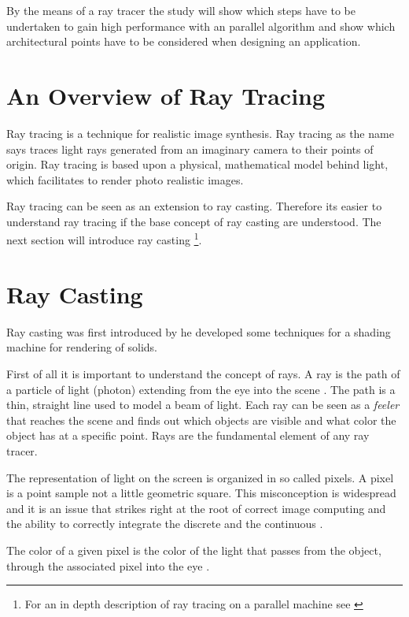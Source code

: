 By the means of a ray tracer the study will show which steps have to be 
undertaken to gain high performance with an parallel algorithm and show which 
architectural points have to be considered when designing an application.

\section{An Overview of Ray Tracing}
Ray tracing is a technique for realistic image synthesis. Ray tracing as the
name says traces light rays generated from an imaginary camera to their points
of origin. Ray tracing is based upon a physical, mathematical model behind
light, which facilitates to render photo realistic images. 

Ray tracing can be seen as an extension to ray casting. Therefore its easier to
understand ray tracing if the base concept of ray casting are understood. The
next section will introduce ray casting \footnote{For an in depth description of
ray tracing on a parallel machine see \citeauthor{citeulike:80546}
\citep{citeulike:80546}}.

\section{Ray Casting}
Ray casting was first introduced by \citeauthor{citeulike:841961}
\citep{citeulike:841961} he developed some techniques for a shading machine for
rendering of solids.

First of all it is important to understand the concept of rays. A ray is the
path of a particle of light (photon) extending from the eye into the
scene \citep{Glassner289}. The path is a thin, straight line used to model a beam
of light. Each ray can be seen as a \textit{feeler} that reaches the 
scene and finds out which objects are visible and what color the object has at a 
specific point. Rays are the fundamental element of any ray tracer.

The representation of light on the screen is organized in so called pixels.
A pixel is a point sample not a little geometric square. This misconception
is widespread and it is an issue that strikes right at the root of correct
image computing and the ability to correctly integrate the discrete and the
continuous \citep{AlvyRaySmith95}.

The color of a given pixel is the color of the light that passes from the
object, through the associated pixel into the eye \citep{Hearn94}.

